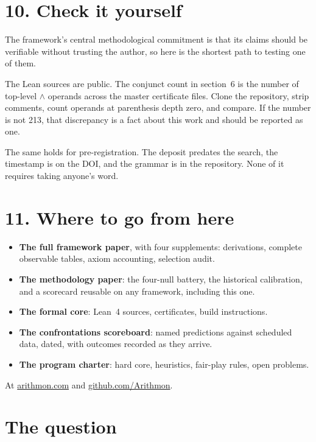 \documentclass[11pt,a4paper]{article}
\begin{document}
\section{10. Check it yourself}

The framework's central methodological commitment is that its claims
should be verifiable without trusting the author, so here is the shortest
path to testing one of them.

The Lean sources are public. The conjunct count in section~6 is the number
of top-level $\wedge$ operands across the master certificate files. Clone
the repository, strip comments, count operands at parenthesis depth zero,
and compare. If the number is not 213, that discrepancy is a fact about
this work and should be reported as one.

The same holds for pre-registration. The deposit predates the search, the
timestamp is on the DOI, and the grammar is in the repository. None of it
requires taking anyone's word.

\section{11. Where to go from here}

\begin{itemize}\tightlist
\item \textbf{The full framework paper}, with four supplements:
  derivations, complete observable tables, axiom accounting, selection
  audit.
\item \textbf{The methodology paper}: the four-null battery, the
  historical calibration, and a scorecard reusable on any framework,
  including this one.
\item \textbf{The formal core}: Lean~4 sources, certificates, build
  instructions.
\item \textbf{The confrontations scoreboard}: named predictions against
  scheduled data, dated, with outcomes recorded as they arrive.
\item \textbf{The program charter}: hard core, heuristics, fair-play
  rules, open problems.
\end{itemize}

At \href{https://arithmon.com}{arithmon.com} and
\href{https://github.com/Arithmon}{github.com/Arithmon}.

\section{The question}
\end{document}
